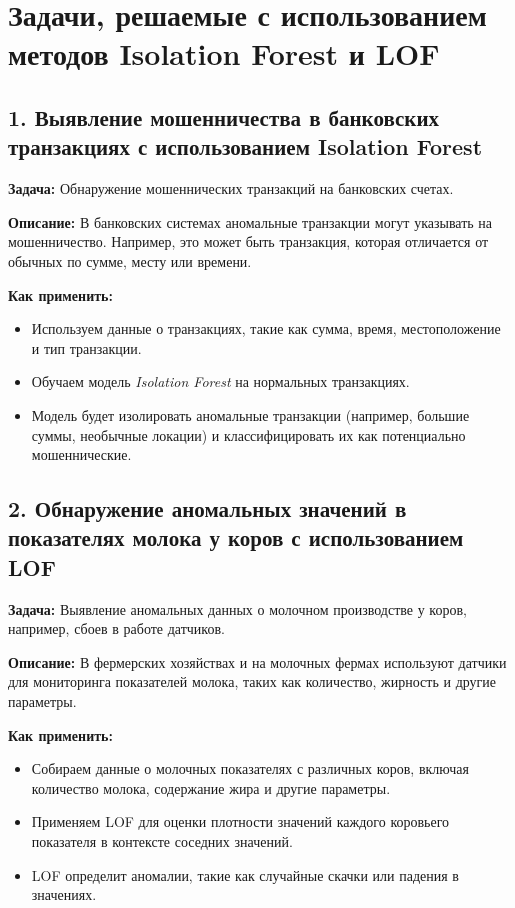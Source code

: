 \section{Задачи, решаемые с использованием методов Isolation Forest и LOF}

\subsection{1. Выявление мошенничества в банковских транзакциях с использованием Isolation Forest}
\textbf{Задача:} Обнаружение мошеннических транзакций на банковских счетах.

\textbf{Описание:} В банковских системах аномальные транзакции могут указывать на мошенничество. Например, это может быть транзакция, которая отличается от обычных по сумме, месту или времени.

\textbf{Как применить:}
\begin{itemize}
    \item Используем данные о транзакциях, такие как сумма, время, местоположение и тип транзакции.
    \item Обучаем модель \textit{Isolation Forest} на нормальных транзакциях.
    \item Модель будет изолировать аномальные транзакции (например, большие суммы, необычные локации) и классифицировать их как потенциально мошеннические.
\end{itemize}

\subsection{2. Обнаружение аномальных значений в показателях молока у коров с использованием LOF}
\textbf{Задача:} Выявление аномальных данных о молочном производстве у коров, например, сбоев в работе датчиков.

\textbf{Описание:} В фермерских хозяйствах и на молочных фермах используют датчики для мониторинга показателей молока, таких как количество, жирность и другие параметры.

\textbf{Как применить:}
\begin{itemize}
    \item Собираем данные о молочных показателях с различных коров, включая количество молока, содержание жира и другие параметры.
    \item Применяем LOF для оценки плотности значений каждого коровьего показателя в контексте соседних значений.
    \item LOF определит аномалии, такие как случайные скачки или падения в значениях.
\end{itemize}

